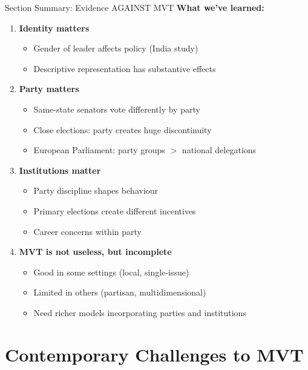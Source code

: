 \documentclass[10pt]{beamer}
\begin{document}
\begin{frame}{Section Summary: Evidence AGAINST MVT}
\textbf{What we've learned:}

\begin{enumerate}
\item \textbf{Identity matters}
\begin{itemize}
\item Gender of leader affects policy (India study)
\item Descriptive representation has substantive effects
\end{itemize}


\item \textbf{Party matters}
\begin{itemize}
\item Same-state senators vote differently by party
\item Close elections: party creates huge discontinuity
\item European Parliament: party groups $>$ national delegations
\end{itemize}


\item \textbf{Institutions matter}
\begin{itemize}
\item Party discipline shapes behaviour
\item Primary elections create different incentives
\item Career concerns within party
\end{itemize}


\item \textbf{MVT is not useless, but incomplete}
\begin{itemize}
\item Good in some settings (local, single-issue)
\item Limited in others (partisan, multidimensional)
\item Need richer models incorporating parties and institutions
\end{itemize}
\end{enumerate}
\end{frame}


\section{Contemporary Challenges to MVT}
\end{document}
